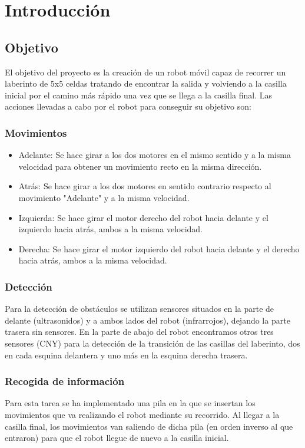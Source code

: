 \chapter{Introducción}
\section{Objetivo}
El objetivo del proyecto es la creación de un robot móvil capaz de recorrer un laberinto de 5x5 celdas tratando de encontrar la salida y volviendo a la casilla inicial por el camino más rápido una vez que se llega a la casilla final.
Las acciones llevadas a cabo por el robot para conseguir su objetivo son:
\subsection{Movimientos}
\begin{itemize}
	\item Adelante: Se hace girar a los dos motores en el mismo sentido y a la misma velocidad para obtener un movimiento recto en la misma dirección.
	\item Atrás: Se hace girar a los dos motores en sentido contrario respecto al movimiento "Adelante" y a la misma velocidad.
	\item Izquierda: Se hace girar el motor derecho del robot hacia delante y el izquierdo hacia atrás, ambos a la misma velocidad.
	\item Derecha: Se hace girar el motor izquierdo del robot hacia delante y el derecho hacia atrás, ambos a la misma velocidad.
\end{itemize}
\subsection{Detección}
Para la detección de obstáculos se utilizan sensores situados en la parte de delante (ultrasonidos) y a ambos lados del robot (infrarrojos), dejando la parte trasera sin sensores. En la parte de abajo del robot encontramos otros tres sensores (CNY) para la detección de la transición de las casillas del laberinto, dos en cada esquina delantera y uno más en la esquina derecha trasera.
\subsection{Recogida de información}
Para esta tarea se ha implementado una pila en la que se insertan los movimientos que va realizando el robot mediante su recorrido. Al llegar a la casilla final, los movimientos van saliendo de dicha pila (en orden inverso al que entraron) para que el robot llegue de nuevo a la casilla inicial.
